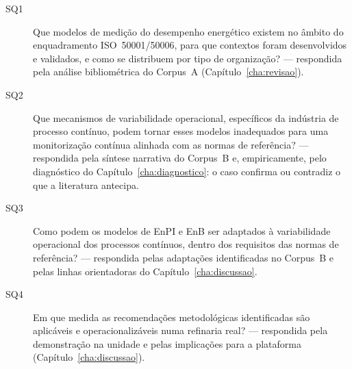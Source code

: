 \begin{description}
  \item[SQ1] Que modelos de medição do desempenho energético existem no
    âmbito do enquadramento ISO~50001/50006, para que contextos foram
    desenvolvidos e validados, e como se distribuem por tipo de
    organização? --- respondida pela análise bibliométrica do Corpus~A
    (Capítulo~\ref{cha:revisao}).
  \item[SQ2] Que mecanismos de variabilidade operacional, específicos da
    indústria de processo contínuo, podem tornar esses modelos
    inadequados para uma monitorização contínua alinhada com as normas
    de referência? --- respondida pela síntese narrativa do Corpus~B e,
    empiricamente, pelo diagnóstico do Capítulo~\ref{cha:diagnostico}: o
    caso confirma ou contradiz o que a literatura antecipa.
  \item[SQ3] Como podem os modelos de EnPI e EnB ser adaptados à
    variabilidade operacional dos processos contínuos, dentro dos
    requisitos das normas de referência? --- respondida pelas
    adaptações identificadas no Corpus~B e pelas linhas orientadoras do
    Capítulo~\ref{cha:discussao}.
  \item[SQ4] Em que medida as recomendações metodológicas identificadas
    são aplicáveis e operacionalizáveis numa refinaria real? ---
    respondida pela demonstração na unidade e pelas implicações para a
    plataforma (Capítulo~\ref{cha:discussao}).
\end{description}



